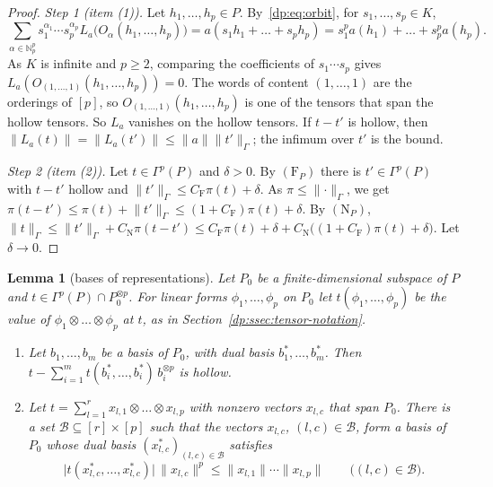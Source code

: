 \documentclass[11pt]{amsart}
\newtheorem{lemma}[theorem]{Lemma}
\theoremstyle{definition}
\theoremstyle{remark}
\numberwithin{equation}{section}
\newcommand{\N}{\mathbb N}
\newcommand{\abs}[1]{\lvert #1\rvert}
\newcommand{\norm}[1]{\lVert #1\rVert}
\theoremstyle{plain}
\theoremstyle{definition}
\theoremstyle{plain}
\begin{document}
\begin{proof}
\emph{Step 1 (item (1)).} Let $h_1,\dots,h_p\in P$. By~\eqref{dp:eq:orbit}, for $s_1,\dots,s_p\in K$,
\[
 \sum_{\alpha\in\N^p_p}s_1^{\alpha_1}\cdots s_p^{\alpha_p}L_a\bigl(O_\alpha(h_1,\dots,h_p)\bigr)
 =a(s_1h_1+\dots+s_ph_p)=s_1^pa(h_1)+\dots+s_p^pa(h_p).
\]
As $K$ is infinite and $p\ge2$, comparing the coefficients of $s_1\cdots s_p$ gives $L_a(O_{(1,\dots,1)}(h_1,\dots,h_p))=0$. The words of content $(1,\dots,1)$ are the orderings of $[p]$, so $O_{(1,\dots,1)}(h_1,\dots,h_p)$ is one of the tensors that span the hollow tensors. So $L_a$ vanishes on the hollow tensors. If $t-t'$ is hollow, then $\norm{L_a(t)}=\norm{L_a(t')}\le\norm a\norm{t'}_\Gamma$; the infimum over $t'$ is the bound.

\emph{Step 2 (item (2)).} Let $t\in\Gamma^p(P)$ and $\delta>0$. By $(\mathrm F_P)$ there is $t'\in\Gamma^p(P)$ with $t-t'$ hollow and $\norm{t'}_\Gamma\le C_{\mathrm F}\pi(t)+\delta$. As $\pi\le\norm\cdot_\Gamma$, we get $\pi(t-t')\le\pi(t)+\norm{t'}_\Gamma\le(1+C_{\mathrm F})\pi(t)+\delta$. By $(\mathrm N_P)$, $\norm t_\Gamma\le\norm{t'}_\Gamma+C_{\mathrm N}\pi(t-t')\le C_{\mathrm F}\pi(t)+\delta+C_{\mathrm N}\bigl((1+C_{\mathrm F})\pi(t)+\delta\bigr)$. Let $\delta\to0$.
\end{proof}

\begin{lemma}[bases of representations]\label{dp:lem:bases}
Let $P_0$ be a finite-dimensional subspace of $P$ and $t\in\Gamma^p(P)\cap P_0^{\otimes p}$. For linear forms $\phi_1,\dots,\phi_p$ on $P_0$ let $t(\phi_1,\dots,\phi_p)$ be the value of $\phi_1\otimes\dots\otimes\phi_p$ at $t$, as in Section~\ref{dp:ssec:tensor-notation}.
\begin{enumerate}
\item Let $b_1,\dots,b_m$ be a basis of $P_0$, with dual basis $b_1^*,\dots,b_m^*$. Then $t-\sum_{i=1}^mt(b_i^*,\dots,b_i^*)\,b_i^{\otimes p}$ is hollow.
\item Let $t=\sum_{l=1}^rx_{l,1}\otimes\dots\otimes x_{l,p}$ with nonzero vectors $x_{l,c}$ that span $P_0$. There is a set $\mathcal B\subseteq[r]\times[p]$ such that the vectors $x_{l,c}$, $(l,c)\in\mathcal B$, form a basis of $P_0$ whose dual basis $(x_{l,c}^*)_{(l,c)\in\mathcal B}$ satisfies
\[
 \abs{t(x_{l,c}^*,\dots,x_{l,c}^*)}\,\norm{x_{l,c}}^p\le\norm{x_{l,1}}\cdots\norm{x_{l,p}}\qquad\bigl((l,c)\in\mathcal B\bigr).
\]
\end{enumerate}
\end{lemma}
\end{document}
